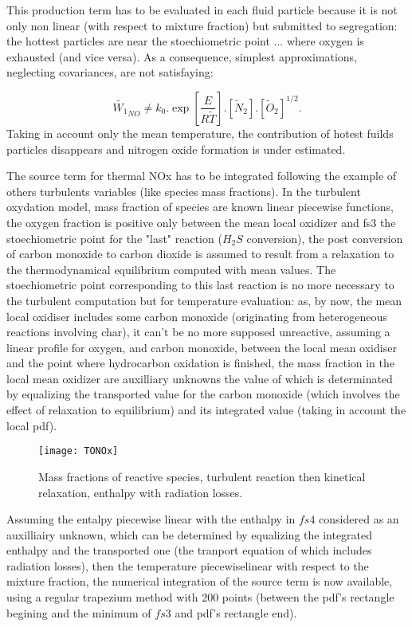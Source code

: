 This production term has to be evaluated in each fluid particle because it is not
only non linear (with respect to mixture fraction) but submitted to segregation:
the hottest particles are near the stoechiometric point ... where oxygen is
exhausted (and vice versa). As a consequence, simplest approximations, neglecting
covariances, are not satisfaying:

\begin{equation*}
 \widetilde{W_1}_{NO} \neq k_0  . \exp \left[\frac{E}{R\tilde{T}}\right].\left[ \widetilde{N}_{2} \right].\left[\widetilde{O}_{2}\right]^{1/2} .
\end{equation*}
Taking in account only the mean temperature, the contribution of hotest fuilds particles disappears and nitrogen oxide formation is under estimated.

The source term for thermal NOx has to be integrated following the example of
others turbulents variables (like species mass fractions). In the turbulent
oxydation model, mass fraction of species are known linear piecewise functions,
the oxygen fraction is positive only between the mean local oxidizer and fs3 the
stoechiometric point for the "last" reaction ($H_{2}S$ conversion), the post
conversion of carbon monoxide to carbon dioxide is assumed to result from a
relaxation to the thermodynamical equilibrium computed with mean values. The
stoechiometric point corresponding to this last reaction is no more necessary to
the turbulent computation but for temperature evaluation: as, by now, the mean
local oxidiser includes some carbon monoxide (originating from heterogeneous
reactions involving char), it can't be no more supposed unreactive, assuming a
linear profile for oxygen, and carbon monoxide, between the local mean oxidiser
and the point where hydrocarbon oxidation is finished, the mass fraction in the
local mean oxidizer are auxilliary unknowns the value of which is determinated
by equalizing the transported value for the carbon monoxide (which involves the
effect of relaxation to equilibrium) and its integrated value (taking in account
the local pdf).
   

\begin{figure}[!htpb]
\centerline{\texttt{[image: TONOx]}}
\caption{Mass fractions of reactive species, turbulent reaction then kinetical relaxation, enthalpy with radiation losses.}
\end{figure}

Assuming the entalpy piecewise linear with the enthalpy in $fs4$ considered as an
auxilliairy unknown, which can be determined by equalizing the integrated
enthalpy and the transported one (the tranport equation of which includes
radiation losses), then the temperature piecewiselinear with respect to the
mixture fraction, the numerical integration of the source term is now available,
using a regular trapezium method with 200 points (between the pdf's rectangle
begining and the minimum of $fs3$ and pdf's rectangle end).

